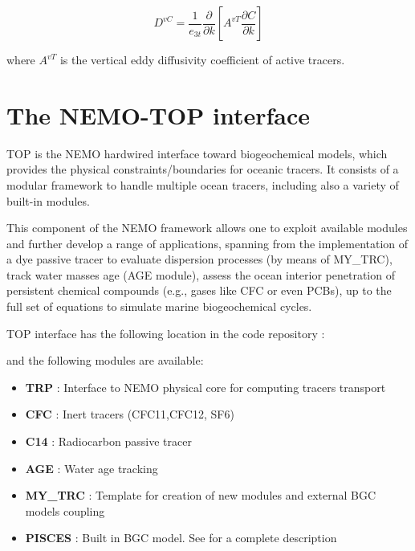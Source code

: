 \documentclass[../main/TOP_manual]{subfiles}
\begin{document}
\begin{equation}
D^{vC} =  \frac{1}{e_{3t}} \frac{\partial}{\partial k} \left[  A^{vT} \frac{\partial C}{\partial k} \right]
\label{Eq_trczdf}
\end{equation}

where $A^{vT}$ is the vertical eddy diffusivity coefficient of active tracers.

\section{The NEMO-TOP interface}
\label{sec:TopInt}

TOP is the NEMO hardwired interface toward biogeochemical models, which provides the physical constraints/boundaries for oceanic tracers.
It consists of a modular framework to handle multiple ocean tracers, including also a variety of built-in modules.

This component of the NEMO framework allows one to exploit available modules and further develop a range of applications, spanning from the implementation of a dye passive tracer to evaluate dispersion processes (by means of MY\_TRC), track water masses age (AGE module), assess the ocean interior penetration of persistent chemical compounds (e.g., gases like CFC or even PCBs), up to the full set of equations to simulate marine biogeochemical cycles.

TOP interface has the following location in the code repository : 

and the following modules are available:

\begin{itemize}
        \item \textbf{TRP}    	 :    Interface to NEMO physical core for computing tracers transport
        \item \textbf{CFC}	 :    Inert tracers (CFC11,CFC12, SF6)
        \item \textbf{C14}	 :    Radiocarbon passive tracer
        \item \textbf{AGE}	 :    Water age tracking
        \item \textbf{MY\_TRC}   :    Template for creation of new modules and external BGC models coupling
        \item \textbf{PISCES}    :    Built in BGC model. See \cite{aumont_2015} for a complete description
\end{itemize}
\end{document}
